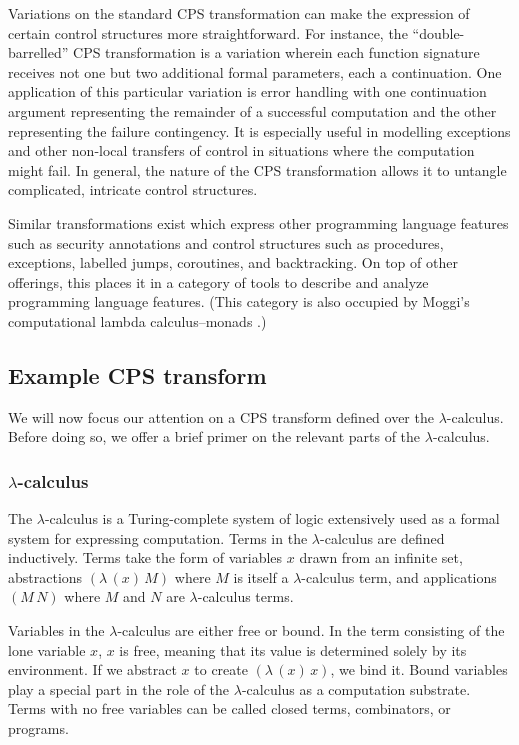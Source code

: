 \documentclass[ms,electronic,twosidetoc,letterpaper,chaptercenter,parttop]{byumsphd}
\newcommand{\abs}[2]{(\lambda\,(#1)\,#2)}
\newcommand{\app}[2]{(#1\,#2)}
\begin{document}
Variations on the standard CPS transformation can make the expression of certain control
structures more straightforward. For instance, the ``double-barrelled'' CPS transformation
is a variation wherein each function signature receives not one but two additional formal
parameters, each a continuation. One application of this particular variation is error
handling with one continuation argument representing the remainder of a successful
computation and the other representing the failure contingency. It is especially useful in
modelling exceptions and other non-local transfers of control in situations where the
computation might fail. In general, the nature of the CPS transformation allows it to
untangle complicated, intricate control structures.

Similar transformations exist which express other programming language features such as
security annotations \cite{wallach2000safkasi} and control structures such as procedures,
exceptions, labelled jumps, coroutines, and backtracking. On top of other offerings, this
places it in a category of tools to describe and analyze programming language features.
(This category is also occupied by Moggi's computational lambda calculus--monads
\cite{moggi1989computational}.)

\subsection{Example CPS transform}

We will now focus our attention on a CPS transform defined over the $\lambda$-calculus.
Before doing so, we offer a brief primer on the relevant parts of the $\lambda$-calculus.

\subsubsection{$\lambda$-calculus}

The $\lambda$-calculus is a Turing-complete system of logic extensively used as a formal
system for expressing computation. Terms in the $\lambda$-calculus are defined
inductively. Terms take the form of variables $x$ drawn from an infinite set, abstractions
$\abs{x}{M}$ where $M$ is itself a $\lambda$-calculus term, and applications $\app{M}{N}$ where
$M$ and $N$ are $\lambda$-calculus terms.

Variables in the $\lambda$-calculus are either free or bound. In the term consisting of
the lone variable $x$, $x$ is free, meaning that its value is determined solely by its
environment. If we abstract $x$ to create $\abs{x}{x}$, we bind it.
Bound variables play a special part in the role of the $\lambda$-calculus as a computation
substrate. Terms with no free variables can be called closed terms, combinators, or programs.
\end{document}
